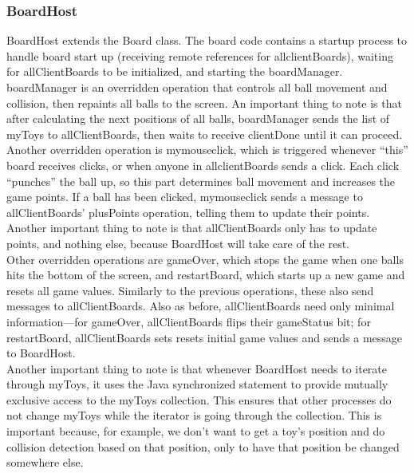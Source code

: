 \documentclass[11pt]{article}
\begin{document}
\subsubsection{BoardHost}
BoardHost extends the Board class.  The board code contains a startup process 
to handle board start up (receiving remote references for allclientBoards), 
waiting for allClientBoards to be initialized, and starting the boardManager.  
boardManager is an overridden operation that controls all ball movement and
collision, then repaints all balls to the screen.  An important thing to note
is that after calculating the next positions of all balls, boardManager sends
the list of myToys to allClientBoards, then waits to receive clientDone until
it can proceed.  
\\
Another overridden operation is mymouseclick, which is triggered whenever 
“this” board receives clicks, or when anyone in allclientBoards sends a click.
Each click “punches” the ball up, so this part determines ball movement and 
increases the game points.  If a ball has been clicked, mymouseclick sends a 
message to allClientBoards’ plusPoints operation, telling them to update their 
points.  Another important thing to note is that allClientBoards only has to 
update points, and nothing else, because BoardHost will take care of the rest.
\\
Other overridden operations are gameOver, which stops the game when one balls 
hits the bottom of the screen, and restartBoard, which starts up a new game 
and resets all game values.  Similarly to the previous operations, these also 
send messages to allClientBoards.  Also as before, allClientBoards need only 
minimal information—for gameOver, allClientBoards flips their gameStatus bit; 
for restartBoard, allClientBoards sets resets initial game values and sends a 
message to BoardHost.  
\\
Another important thing to note is that whenever BoardHost needs to iterate 
through myToys, it uses the Java synchronized statement to provide mutually 
exclusive access to the myToys collection.  This ensures that other processes 
do not change myToys while the iterator is going through the collection.  This 
is important because, for example, we don’t want to get a toy’s position and 
do collision detection based on that position, only to have that position be 
changed somewhere else.
\end{document}
